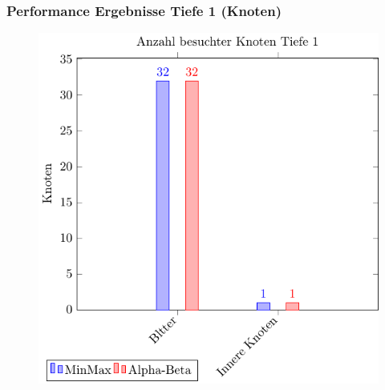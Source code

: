 \documentclass{beamer}
\begin{document}

\begin{frame}
\frametitle{Performance Ergebnisse Tiefe 1 (Knoten)}
  \begin{figure}
    \centering
    \includegraphics[scale=0.8]{figures/node-1.pdf}
  \end{figure}

\end{frame}

\end{document}
